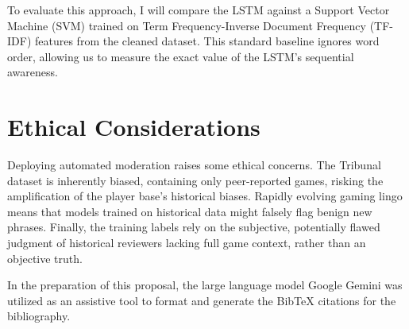 To evaluate this approach, I will compare the LSTM against a Support Vector Machine (SVM) trained on Term Frequency-Inverse Document Frequency (TF-IDF) features from the cleaned dataset. This standard baseline ignores word order, allowing us to measure the exact value of the LSTM's sequential awareness.  

\section*{Ethical Considerations}

Deploying automated moderation raises some ethical concerns. The Tribunal dataset is inherently biased, containing only peer-reported games, risking the amplification of the player base's historical biases. Rapidly evolving gaming lingo means that models trained on historical data might falsely flag benign new phrases. Finally, the training labels rely on the subjective, potentially flawed judgment of historical reviewers lacking full game context, rather than an objective truth.


In the preparation of this proposal, the large language model Google Gemini was utilized as an assistive tool to format and generate the BibTeX citations for the bibliography.




